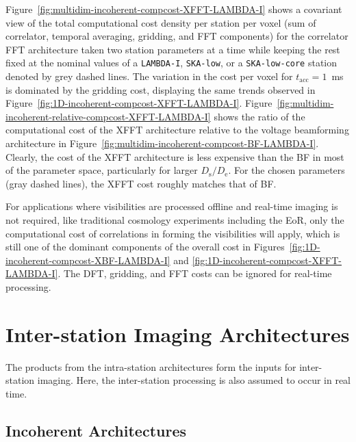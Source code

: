 \documentclass[
  journal=pasa,
  manuscript=article-type,
  year=2020,
  volume=37,
]{cup-journal}
\begin{document}
Figure~\ref{fig:multidim-incoherent-compcost-XFFT-LAMBDA-I} shows a covariant view of the total computational cost density per station per voxel (sum of correlator, temporal averaging, gridding, and FFT components) for the correlator FFT architecture taken two station parameters at a time while keeping the rest fixed at the nominal values of a \texttt{LAMBDA-I}, \texttt{SKA-low}, or a \texttt{SKA-low-core} station denoted by grey dashed lines. The variation in the cost per voxel for $t_\textrm{acc}=1$~ms is dominated by the gridding cost, displaying the same trends observed in Figure~\ref{fig:1D-incoherent-compcost-XFFT-LAMBDA-I}. Figure~\ref{fig:multidim-incoherent-relative-compcost-XFFT-LAMBDA-I} shows the ratio of the computational cost of the XFFT architecture relative to the voltage beamforming architecture in Figure~\ref{fig:multidim-incoherent-compcost-BF-LAMBDA-I}. Clearly, the cost of the XFFT architecture is less expensive than the BF in most of the parameter space, particularly for larger $D_\textrm{s}/D_\textrm{e}$. For the chosen parameters (gray dashed lines), the XFFT cost roughly matches that of BF.

For applications where visibilities are processed offline and real-time imaging is not required, like traditional cosmology experiments including the EoR, only the computational cost of correlations in forming the visibilities will apply, which is still one of the dominant components of the overall cost in Figures~\ref{fig:1D-incoherent-compcost-XBF-LAMBDA-I} and \ref{fig:1D-incoherent-compcost-XFFT-LAMBDA-I}. The DFT, gridding, and FFT costs can be ignored for real-time processing.

\section{Inter-station Imaging Architectures} \label{sec:inter-station-arch}

The products from the intra-station architectures form the inputs for inter-station imaging. Here, the inter-station processing is also assumed to occur in real time. 

\subsection{Incoherent Architectures} \label{sec:incoherent}
\end{document}

